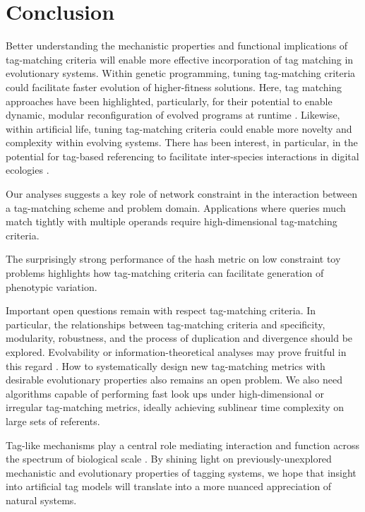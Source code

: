 \section{Conclusion}

Better understanding the mechanistic properties and functional implications of tag-matching criteria will enable more effective incorporation of tag matching in evolutionary systems.
Within genetic programming, tuning tag-matching criteria could facilitate faster evolution of higher-fitness solutions.
Here, tag matching approaches have been highlighted, particularly, for their potential to enable dynamic, modular reconfiguration of evolved programs at runtime \citep{spector2011tag,lalejini2021tag}.
Likewise, within artificial life, tuning tag-matching criteria could enable more novelty and complexity within evolving systems.
There has been interest, in particular, in the potential for tag-based referencing to facilitate inter-species interactions in digital ecologies \citep{dolson2021review}.

Our analyses suggests a key role of network constraint in the interaction between a tag-matching scheme and problem domain.
Applications where queries much match tightly with multiple operands require high-dimensional tag-matching criteria.

The surprisingly strong performance of the hash metric on low constraint toy problems highlights how tag-matching criteria can facilitate generation of phenotypic variation.

Important open questions remain with respect tag-matching criteria.
In particular, the relationships between tag-matching criteria and specificity, modularity, robustness, and the process of duplication and divergence should be explored.
Evolvability or information-theoretical analyses may prove fruitful in this regard \citep{tarapore2015evolvability}.
How to systematically design new tag-matching metrics with desirable evolutionary properties also remains an open problem.
We also need algorithms capable of performing fast look ups under high-dimensional or irregular tag-matching metrics, ideally achieving sublinear time complexity on large sets of referents.

Tag-like mechanisms play a central role mediating interaction and function across the spectrum of biological scale \citep{holland2012signals}.
By shining light on previously-unexplored mechanistic and evolutionary properties of tagging systems, we hope that insight into artificial tag models will translate into a more nuanced appreciation of natural systems.
